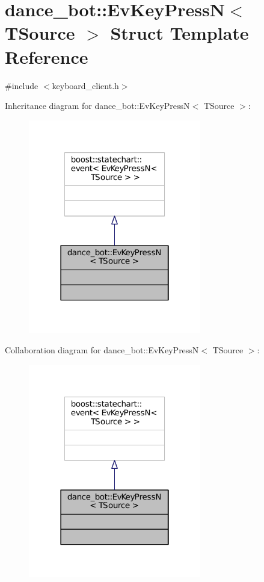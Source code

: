 \hypertarget{structdance__bot_1_1EvKeyPressN}{}\section{dance\+\_\+bot\+:\+:Ev\+Key\+PressN$<$ T\+Source $>$ Struct Template Reference}
\label{structdance__bot_1_1EvKeyPressN}


{\ttfamily \#include $<$keyboard\+\_\+client.\+h$>$}



Inheritance diagram for dance\+\_\+bot\+:\+:Ev\+Key\+PressN$<$ T\+Source $>$\+:
\nopagebreak
\begin{figure}[H]
\begin{center}
\leavevmode
\includegraphics[width=214pt]{structdance__bot_1_1EvKeyPressN__inherit__graph}
\end{center}
\end{figure}


Collaboration diagram for dance\+\_\+bot\+:\+:Ev\+Key\+PressN$<$ T\+Source $>$\+:
\nopagebreak
\begin{figure}[H]
\begin{center}
\leavevmode
\includegraphics[width=214pt]{structdance__bot_1_1EvKeyPressN__coll__graph}
\end{center}
\end{figure}


